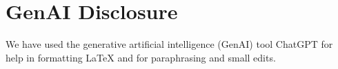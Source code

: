 \documentclass[sigconf,anonymous,review]{acmart}
\begin{document}

\maketitle









\pagebreak

\section*{GenAI Disclosure}

We have used the generative artificial intelligence (GenAI) tool ChatGPT for help in formatting \LaTeX{} and for paraphrasing and small edits.



\end{document}
